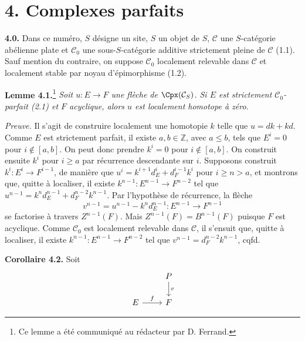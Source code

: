 \section*{4. Complexes parfaits}

\textbf{4.0.} Dans ce numéro, \(S\) désigne un site, \(S\) un objet de \(S\), \(\mathcal C\) une \(S\)-catégorie abélienne plate et \(\mathcal C_0\) une sous-\(S\)-catégorie additive strictement pleine de \(\mathcal C\) (1.1). Sauf mention du contraire, on suppose \(\mathcal C_0\) localement relevable dans \(\mathcal C\) et localement stable par noyau d'épimorphisme (1.2).

\textbf{Lemme 4.1.}\footnote{Ce lemme a été communiqué au rédacteur par D. Ferrand.} \emph{Soit \(u:E\to F\) une flèche de \(\Cpx(\mathcal C_S)\). Si \(E\) est strictement \(\mathcal C_0\)-parfait (2.1) et \(F\) acyclique, alors \(u\) est localement homotope à zéro.}

\emph{Preuve.} Il s'agit de construire localement une homotopie \(k\) telle que \(u=dk+kd\). Comme \(E\) est strictement parfait, il existe \(a,b\in\mathbb Z\), avec \(a\leq b\), tels que \(E^i=0\) pour \(i\notin[a,b]\). On peut donc prendre \(k^i=0\) pour \(i\notin[a,b]\). On construit ensuite \(k^i\) pour \(i\geq a\) par récurrence descendante sur \(i\). Supposons construit \(k^i:E^i\to F^{i-1}\), de manière que \(u^i=k^{i+1}d_E^i+d_F^{i-1}k^i\) pour \(i\geq n>a\), et montrons que, quitte à localiser, il existe \(k^{n-1}:E^{n-1}\to F^{n-2}\) tel que \(u^{n-1}=k^nd_E^{n-1}+d_F^{n-2}k^{n-1}\). Par l'hypothèse de récurrence, la flèche
\[
  v^{n-1}=u^{n-1}-k^nd_E^{n-1}:E^{n-1}\to F^{n-1}
\]
se factorise à travers \(Z^{n-1}(F)\). Mais \(Z^{n-1}(F)=B^{n-1}(F)\) puisque \(F\) est acyclique. Comme \(\mathcal C_0\) est localement relevable dans \(\mathcal C\), il s'ensuit que, quitte à localiser, il existe \(k^{n-1}:E^{n-1}\to F^{n-2}\) tel que \(v^{n-1}=d_F^{n-2}k^{n-1}\), cqfd.

\textbf{Corollaire 4.2.} Soit
\[
\begin{tikzcd}
& P \arrow[d,"v"] \\
E \arrow[r,"f"] & F
\end{tikzcd}
\]
